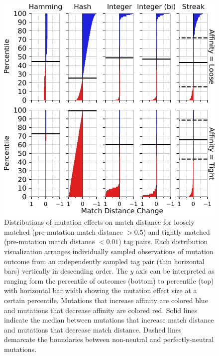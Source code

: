 \begin{figure}
\begin{center}

\includegraphics[width=\columnwidth]{img/mutational_step/bitweight=0dot5+seed=1+title=low-mutational-step+_data_hathash_hash=95a57768de56995a+_script_fullcat_hash=b9a24f3843e31e82+ext=}
\caption{
Distributions of mutation effects on match distance for loosely matched (pre-mutation match distance $> 0.5$) and tightly matched (pre-mutation match distance $< 0.01$) tag pairs.
Each distribution visualization arranges individually sampled observations of mutation outcome from an independently sampled tag pair (thin horizontal bars) vertically in descending order.
The $y$ axis can be interpreted as ranging form the  percentile of outcomes (bottom) to  percentile (top) with horizontal bar width showing the mutation effect size at a certain percentile.
Mutations that increase affinity are colored blue and mutations that decrease affinity are colored red.
Solid lines indicate the median between mutations that increase match distance and mutations that decrease match distance.
Dashed lines demarcate the boundaries between non-neutral and perfectly-neutral mutations.
}
\label{fig:mutational_step}

\end{center}
\end{figure}
